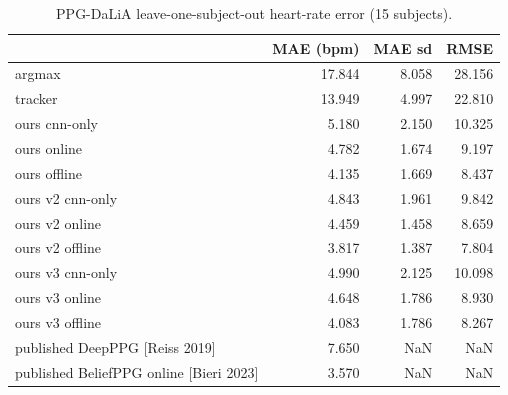 \begin{table}
\caption{PPG-DaLiA leave-one-subject-out heart-rate error (15 subjects).}
\label{tab:ppg_results}
\begin{tabular}{lrrr}
\toprule
 & MAE (bpm) & MAE sd & RMSE \\
\midrule
argmax & 17.844 & 8.058 & 28.156 \\
tracker & 13.949 & 4.997 & 22.810 \\
ours cnn-only & 5.180 & 2.150 & 10.325 \\
ours online & 4.782 & 1.674 & 9.197 \\
ours offline & 4.135 & 1.669 & 8.437 \\
ours v2 cnn-only & 4.843 & 1.961 & 9.842 \\
ours v2 online & 4.459 & 1.458 & 8.659 \\
ours v2 offline & 3.817 & 1.387 & 7.804 \\
ours v3 cnn-only & 4.990 & 2.125 & 10.098 \\
ours v3 online & 4.648 & 1.786 & 8.930 \\
ours v3 offline & 4.083 & 1.786 & 8.267 \\
published DeepPPG [Reiss 2019] & 7.650 & NaN & NaN \\
published BeliefPPG online [Bieri 2023] & 3.570 & NaN & NaN \\
\bottomrule
\end{tabular}
\end{table}
